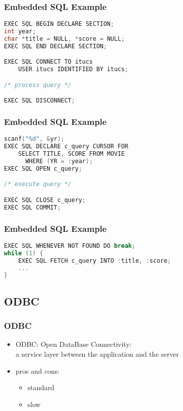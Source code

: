 \documentclass[dvipsnames]{beamer}
\theoremstyle{plain}
\begin{document}
\begin{frame}[fragile]
  \frametitle{Embedded SQL Example}

  \begin{example}[connecting]
    \begin{lstlisting}[language=C]
EXEC SQL BEGIN DECLARE SECTION;
int year;
char *title = NULL, *score = NULL;
EXEC SQL END DECLARE SECTION;

EXEC SQL CONNECT TO itucs
    USER itucs IDENTIFIED BY itucs;

/* process query */

EXEC SQL DISCONNECT;
    \end{lstlisting}
 \end{example}
\end{frame}

\begin{frame}[fragile]
  \frametitle{Embedded SQL Example}

  \begin{example}
    \begin{lstlisting}[language=C]
scanf("%d", &yr);
EXEC SQL DECLARE c_query CURSOR FOR
    SELECT TITLE, SCORE FROM MOVIE
      WHERE (YR = :year);
EXEC SQL OPEN c_query;

/* execute query */

EXEC SQL CLOSE c_query;
EXEC SQL COMMIT;
    \end{lstlisting}
 \end{example}
\end{frame}

\begin{frame}[fragile]
  \frametitle{Embedded SQL Example}

  \begin{example}
    \begin{lstlisting}[language=C]
EXEC SQL WHENEVER NOT FOUND DO break;
while (1) {
    EXEC SQL FETCH c_query INTO :title, :score;
    ...
}
    \end{lstlisting}
 \end{example}
\end{frame}

\subsection{ODBC}

\begin{frame}[label=odbc]
  \frametitle{ODBC}

  \begin{itemize}
    \item \alert{ODBC}: Open DataBase Connectivity:\\
      a service layer between the application and the server

    \pause
    \bigskip
    \item pros and cons:
    \begin{itemize}
      \item standard
      \item slow
    \end{itemize}
  \end{itemize}
\end{frame}
\end{document}
